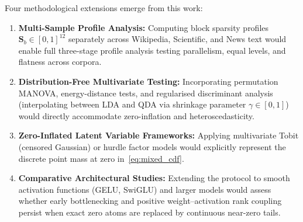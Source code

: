 \documentclass[12pt, a4paper, oneside]{report}
\theoremstyle{definition}
\newcommand{\vect}[1]{\mathbf{#1}}
\begin{document}
Four methodological extensions emerge from this work:
\begin{enumerate}
    \item \textbf{Multi-Sample Profile Analysis:} Computing block sparsity profiles $\vect{S}_b \in [0, 1]^{12}$ separately across Wikipedia, Scientific, and News text would enable full three-stage profile analysis testing parallelism, equal levels, and flatness across corpora.
    \item \textbf{Distribution-Free Multivariate Testing:} Incorporating permutation MANOVA, energy-distance tests, and regularised discriminant analysis (interpolating between LDA and QDA via shrinkage parameter $\gamma \in [0, 1]$) would directly accommodate zero-inflation and heteroscedasticity.
    \item \textbf{Zero-Inflated Latent Variable Frameworks:} Applying multivariate Tobit (censored Gaussian) or hurdle factor models would explicitly represent the discrete point mass at zero in~\eqref{eq:mixed_cdf}.
    \item \textbf{Comparative Architectural Studies:} Extending the protocol to smooth activation functions (GELU, SwiGLU) and larger models would assess whether early bottlenecking and positive weight--activation rank coupling persist when exact zero atoms are replaced by continuous near-zero tails.
\end{enumerate}
\end{document}

